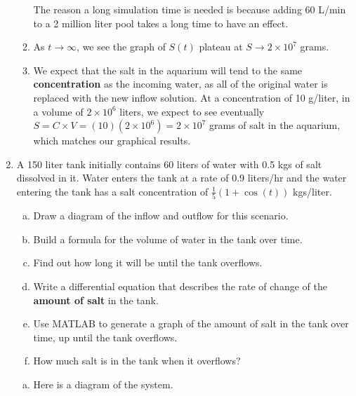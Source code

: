 \begin{enumerate}[1.]
\begin{Solution}
\begin{enumerate}
The reason a long simulation time is needed is because adding 60 L/min
to a 2 million liter pool takes a long time to have an effect.
\item As $t \to \infty$, we see the graph of $S(t)$ plateau at $S \to 2 \times 10^7$ grams.

\item We expect that the salt in the aquarium will tend to the same
  {\bf concentration} as the incoming water, as all of the original
  water is replaced with the new inflow solution.  At a concentration
  of 10 g/liter, in a volume of $ 2 \times 10^6$ liters, we expect to
  see eventually $S = C\times V = (10)(2 \times 10^6) = 2 \times 10^7$
  grams of salt in the aquarium, which matches our graphical results.

\end{enumerate}
\end{Solution}



\item 
\begin{Question}
  A 150 liter tank initially contains 60 liters of water with 0.5 kgs
  of salt dissolved in it.  Water enters the tank at a rate of 0.9
  liters/hr and the water entering the tank has a salt concentration
  of $\frac{1}{5}(1 + \cos (t))$ kgs/liter. 
  \begin{enumerate}[(a)]
  \item Draw a diagram of the inflow and outflow for this scenario.
  \item Build a formula for the volume of water in the tank over time.
  \item Find out how long it will be until the tank overflows.
  \item Write a differential equation that describes the rate of
    change of the {\bf amount of salt} in the tank.
  \item Use MATLAB to generate a graph of the amount of salt in the
    tank over time, up until the tank overflows.
  \item How much salt is in the tank when it overflows?
  \end{enumerate}

\end{Question}

\begin{Solution}
  \begin{enumerate}[(a)]
  \item Here is a diagram of the system.


\end{enumerate}
\end{Solution}
\end{enumerate}
